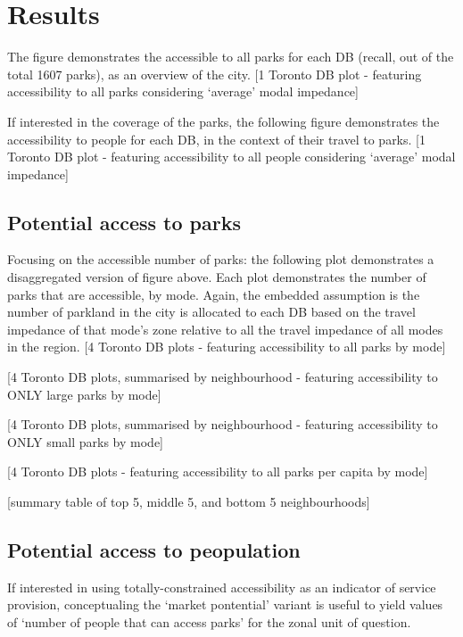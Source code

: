 \documentclass[
11pt, %
oneside, %
english, %
singlespacing, %
]{macthesis} %
\begin{document}
\section{Results}\label{results}

The figure demonstrates the accessible to all parks for each DB (recall, out of the total 1607 parks), as an overview of the city.
{[}1 Toronto DB plot - featuring accessibility to all parks considering `average' modal impedance{]}

If interested in the coverage of the parks, the following figure demonstrates the accessibility to people for each DB, in the context of their travel to parks.
{[}1 Toronto DB plot - featuring accessibility to all people considering `average' modal impedance{]}

\subsection{Potential access to parks}\label{potential-access-to-parks}

Focusing on the accessible number of parks: the following plot demonstrates a disaggregated version of figure above. Each plot demonstrates the number of parks that are accessible, by mode. Again, the embedded assumption is the number of parkland in the city is allocated to each DB based on the travel impedance of that mode's zone relative to all the travel impedance of all modes in the region.
{[}4 Toronto DB plots - featuring accessibility to all parks by mode{]}

{[}4 Toronto DB plots, summarised by neighbourhood - featuring accessibility to ONLY large parks by mode{]}

{[}4 Toronto DB plots, summarised by neighbourhood - featuring accessibility to ONLY small parks by mode{]}

{[}4 Toronto DB plots - featuring accessibility to all parks per capita by mode{]}

{[}summary table of top 5, middle 5, and bottom 5 neighbourhoods{]}

\subsection{Potential access to peopulation}\label{potential-access-to-peopulation}

If interested in using totally-constrained accessibility as an indicator of service provision, conceptualing the `market pontential' variant is useful to yield values of `number of people that can access parks' for the zonal unit of question.
\end{document}
